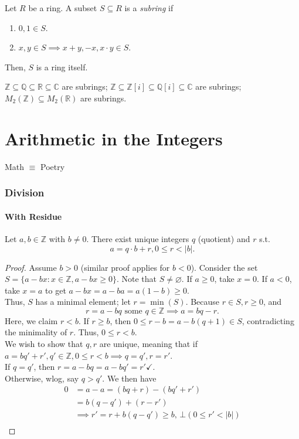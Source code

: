 \documentclass[12pt,oneside]{article}
\begin{document}
\begin{definition}[Subring]
  Let $R$ be a ring. A subset $S \subseteq R$ is a \emph{subring} if \begin{enumerate}
    \item $0,1 \in S$.
    \item $x,y \in S \implies x + y, -x, x \cdot y \in S$.
  \end{enumerate}
  Then, $S$ is a ring itself.

  $\mathbb{Z} \subseteq \mathbb{Q} \subseteq \mathbb{R} \subseteq \mathbb{C}$ are subrings; $\mathbb{Z} \subseteq \mathbb{Z}[i] \subseteq \mathbb{Q}[i] \subseteq \mathbb{C}$ are subrings; $M_2 (\mathbb{Z}) \subseteq M_2(\mathbb{R})$ are subrings.
\end{definition}

\newpage
\part{Arithmetic in the Integers}
\begin{displayquote}
Math $\equiv$ Poetry 
\end{displayquote}

\section{Division}
\subsection{With Residue}
\begin{theorem}
  Let $a,b \in \mathbb{Z}$ with $b\neq 0$. There exist unique integers $q$ (quotient) and $r$ s.t.\[a = q \cdot b + r, 0 \leq r < |b|.\]
\end{theorem}

\begin{proof}
  Assume $b>0$ (similar proof applies for $b < 0$). Consider the set $S = \{a - bx: x\in \mathbb{Z}, a - bx \geq 0\}.$ Note that $S \neq \varnothing$. If $a \geq 0$, take $x = 0$. If $a < 0$, take $x = a$ to get $a-bx=a-ba=a(1-b) \geq 0$.\\
  Thus, $S$ has a minimal element; let $r = \min(S)$. Because $r \in S, r \geq 0$, and \[r = a-bq \text{ some } q \in \mathbb{Z} \implies a= bq - r.\] Here, we claim $r < b$. If $r \geq b$, then $0 \leq r - b = a - b(q+1) \in S$, contradicting the minimality of $r$. Thus, $0 \leq r < b$.\\
  We wish to show that $q, r$ are unique, meaning that if $a = bq' + r', q' \in \mathbb{Z}, 0 \leq r < b \implies q = q', r=r'$.\\
  If $q = q'$, then $r = a -b q = a - bq' = r' \checkmark$.\\
  Otherwise, wlog, say $q > q'$. We then have \begin{align*}
    0 &= a - a = (bq +r) - (bq' + r')\\
    &= b(q-q') + (r-r')\\
    &\implies r' = r + b(q-q') \geq b,\,\bot (0 \leq r' < |b|)\\
  \end{align*}
\end{proof}
\end{document}

